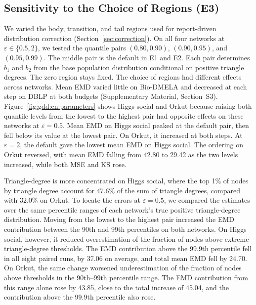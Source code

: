 \subsection{Sensitivity to the Choice of Regions (E3)}\label{sec:gdd:en:parameters}
We varied the body, transition, and tail regions used for report-driven distribution correction (Section~\ref{sec:correction}). On all four networks at $\varepsilon\in\{0.5,2\}$, we tested the quantile pairs $(0.80,0.90)$, $(0.90,0.95)$, and $(0.95,0.99)$. The middle pair is the default in E1 and E2. Each pair determines $b_1$ and $b_2$ from the base population distribution conditional on positive triangle degrees. The zero region stays fixed. 
The choice of regions had different effects across networks. Mean EMD varied little on Bio-DMELA and decreased at each step on DBLP at both budgets (Supplementary Material, Section~S3). Figure~\ref{fig:gdd:en:parameters} shows Higgs social and Orkut because raising both quantile levels from the lowest to the highest pair had opposite effects on these networks at $\varepsilon=0.5$. Mean EMD on Higgs social peaked at the default pair, then fell below its value at the lowest pair. On Orkut, it increased at both steps. At $\varepsilon=2$, the default gave the lowest mean EMD on Higgs social. The ordering on Orkut reversed, with mean EMD falling from 42.80 to 29.42 as the two levels increased, while both MSE and KS rose.


Triangle-degree is more concentrated on Higgs social, where the top 1\% of nodes by triangle degree account for 47.6\% of the sum of triangle degrees, compared with 32.0\% on Orkut. To locate the errors at $\varepsilon=0.5$, we compared the estimates over the same percentile ranges of each network's true positive triangle-degree distribution. Moving from the lowest to the highest pair increased the EMD contribution between the 90th and 99th percentiles on both networks. On Higgs social, however, it reduced overestimation of the fraction of nodes above extreme triangle-degree thresholds. The EMD contribution above the 99.9th percentile fell in all eight paired runs, by 37.06 on average, and total mean EMD fell by 24.70. On Orkut, the same change worsened underestimation of the fraction of nodes above thresholds in the 90th--99th percentile range. The EMD contribution from this range alone rose by 43.85, close to the total increase of 45.04, and the contribution above the 99.9th percentile also rose.
